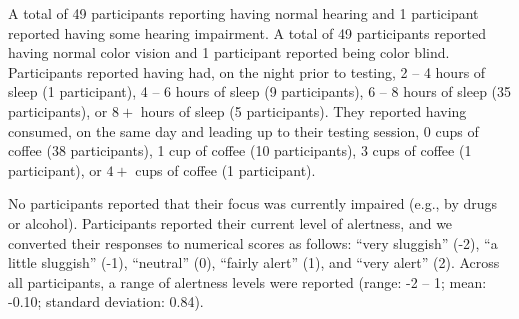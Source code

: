 \documentclass[10pt]{article}
\begin{document}
A total of 49 participants reporting having normal hearing and 1
participant reported having some hearing impairment. A total of 49
participants reported having normal color vision and 1 participant
reported being color blind.  Participants reported having had, on the
night prior to testing, 2 -- 4 hours of sleep (1 participant), 4 -- 6
hours of sleep (9 participants), 6 -- 8 hours of sleep (35
participants), or $8+$ hours of sleep (5 participants). They reported
having consumed, on the same day and leading up to their testing
session, 0 cups of coffee (38 participants), 1 cup of coffee (10
participants), 3 cups of coffee (1 participant), or $4+$ cups of
coffee (1 participant).

No participants reported that their focus was currently impaired
(e.g., by drugs or alcohol).  Participants reported their current
level of alertness, and we converted their responses to numerical
scores as follows: ``very sluggish'' (-2), ``a little sluggish'' (-1),
``neutral'' (0), ``fairly alert'' (1), and ``very alert'' (2). Across
all participants, a range of alertness levels were reported (range: -2
-- 1; mean: -0.10; standard deviation: 0.84).
\end{document}

